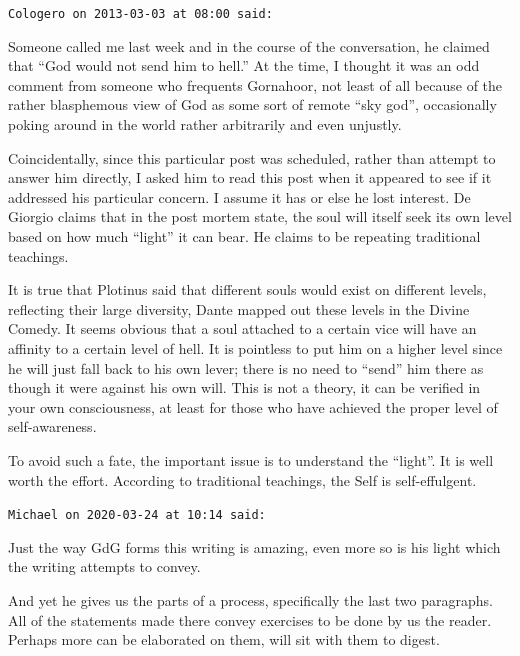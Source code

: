 \begin{footnotesize}
\begin{sffamily}
\hfill

\texttt{Cologero on 2013-03-03 at 08:00 said:}

Someone called me last week and in the course of the conversation, he claimed that ``God would not send him to hell.'' At the time, I thought it was an odd comment from someone who frequents Gornahoor, not least of all because of the rather blasphemous view of God as some sort of remote ``sky god'', occasionally poking around in the world rather arbitrarily and even unjustly.

Coincidentally, since this particular post was scheduled, rather than attempt to answer him directly, I asked him to read this post when it appeared to see if it addressed his particular concern. I assume it has or else he lost interest. De Giorgio claims that in the post mortem state, the soul will itself seek its own level based on how much ``light'' it can bear. He claims to be repeating traditional teachings.

It is true that Plotinus said that different souls would exist on different levels, reflecting their large diversity, Dante mapped out these levels in the Divine Comedy. It seems obvious that a soul attached to a certain vice will have an affinity to a certain level of hell. It is pointless to put him on a higher level since he will just fall back to his own lever; there is no need to ``send'' him there as though it were against his own will. This is not a theory, it can be verified in your own consciousness, at least for those who have achieved the proper level of self-awareness.

To avoid such a fate, the important issue is to understand the ``light''. It is well worth the effort. According to traditional teachings, the Self is self-effulgent.

\hfill

\texttt{Michael on 2020-03-24 at 10:14 said:}

Just the way GdG forms this writing is amazing, even more so is his light which the writing attempts to convey.

And yet he gives us the parts of a process, specifically the last two paragraphs. All of the statements made there convey exercises to be done by us the reader. Perhaps more can be elaborated on them, will sit with them to digest.

\hfill

\end{sffamily}
\end{footnotesize}
